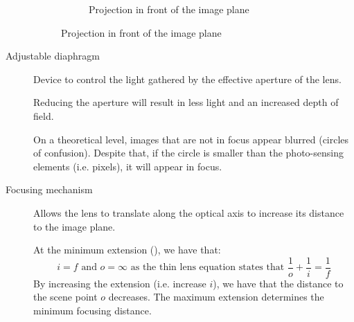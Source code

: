 \begin{description}
\begin{remark}
\begin{figure}[H]
\begin{subfigure}{0.3\textwidth}
                    \caption{Projection in front of the image plane}
                \end{subfigure}
            \end{figure}
        \end{remark}

    \item[Adjustable diaphragm] 
        Device to control the light gathered by the effective aperture of the lens.

        Reducing the aperture will result in less light and an increased depth of field.

        \begin{remark}
            On a theoretical level, images that are not in focus appear blurred (circles of confusion).
            Despite that, if the circle is smaller than the photo-sensing elements (i.e. pixels), it will appear in focus.
        \end{remark}

    \item[Focusing mechanism] 
        Allows the lens to translate along the optical axis to increase its distance to the image plane.

        At the minimum extension (), we have that:
            \[ i = f \text{ and } o = \infty \text{ as the thin lens equation states that } \frac{1}{o} + \frac{1}{i} = \frac{1}{f} \]
        By increasing the extension (i.e. increase $i$), we have that the distance to the scene point $o$ decreases.
        The maximum extension determines the minimum focusing distance.


\end{description}
